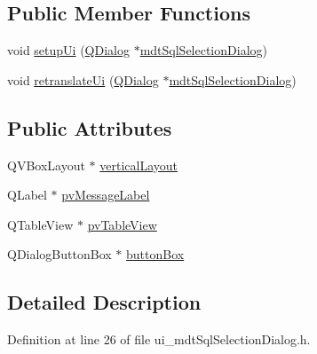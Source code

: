 \subsection*{Public Member Functions}
\begin{DoxyCompactItemize}
\item 
void \hyperlink{class_ui__mdt_sql_selection_dialog_adafdb11feaeb9b9a150751bafb9acd69}{setup\-Ui} (\hyperlink{class_q_dialog}{Q\-Dialog} $\ast$\hyperlink{classmdt_sql_selection_dialog}{mdt\-Sql\-Selection\-Dialog})
\item 
void \hyperlink{class_ui__mdt_sql_selection_dialog_a0e5f714fa1d54f84318315b4dab2df04}{retranslate\-Ui} (\hyperlink{class_q_dialog}{Q\-Dialog} $\ast$\hyperlink{classmdt_sql_selection_dialog}{mdt\-Sql\-Selection\-Dialog})
\end{DoxyCompactItemize}
\subsection*{Public Attributes}
\begin{DoxyCompactItemize}
\item 
Q\-V\-Box\-Layout $\ast$ \hyperlink{class_ui__mdt_sql_selection_dialog_affb3ab01a106df2d196a1fd0666278be}{vertical\-Layout}
\item 
Q\-Label $\ast$ \hyperlink{class_ui__mdt_sql_selection_dialog_a82a1af17dadcc1a6efe2f14d249c14db}{pv\-Message\-Label}
\item 
Q\-Table\-View $\ast$ \hyperlink{class_ui__mdt_sql_selection_dialog_a869b052bbdf1b6e19f13b5a29f23bbff}{pv\-Table\-View}
\item 
Q\-Dialog\-Button\-Box $\ast$ \hyperlink{class_ui__mdt_sql_selection_dialog_a46ea1a6b44d579fb64e6add76105a8df}{button\-Box}
\end{DoxyCompactItemize}


\subsection{Detailed Description}


Definition at line 26 of file ui\-\_\-mdt\-Sql\-Selection\-Dialog.\-h.



